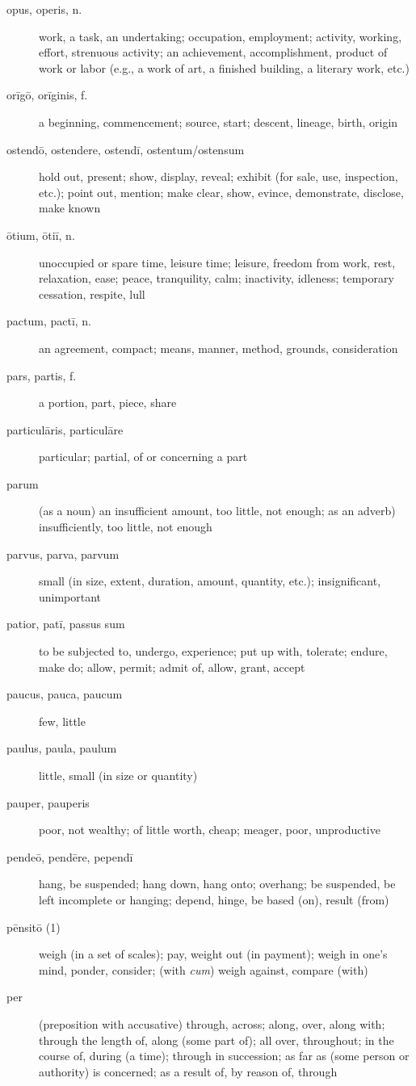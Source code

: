 \begin{description}
    \item[opus, operis, n.] work, a task, an undertaking; occupation, employment; activity, working, effort, strenuous activity; an achievement, accomplishment, product of work or labor (e.g., a work of art, a finished building, a literary work, etc.)
    \item[orīgō, orīginis, f.] a beginning, commencement; source, start; descent, lineage, birth, origin
    \item[ostendō, ostendere, ostendī, ostentum/ostensum] hold out, present; show, display, reveal; exhibit (for sale, use, inspection, etc.); point out, mention; make clear, show, evince, demonstrate, disclose, make known
    \item[ōtium, ōtiī, n.] unoccupied or spare time, leisure time; leisure, freedom from work, rest, relaxation, ease; peace, tranquility, calm; inactivity, idleness; temporary cessation, respite, lull
    \item[pactum, pactī, n.] an agreement, compact; means, manner, method, grounds, consideration
    \item[pars, partis, f.] a portion, part, piece, share
    \item[particulāris, particulāre] particular; partial, of or concerning a part
    \item[parum] (as a noun) an insufficient amount, too little, not enough; as an adverb) insufficiently, too little, not enough
    \item[parvus, parva, parvum] small (in size, extent, duration, amount, quantity, etc.); insignificant, unimportant
    \item[patior, patī, passus sum] to be subjected to, undergo, experience; put up with, tolerate; endure, make do; allow, permit; admit of, allow, grant, accept
    \item[paucus, pauca, paucum] few, little
    \item[paulus, paula, paulum] little, small (in size or quantity)
    \item[pauper, pauperis] poor, not wealthy; of little worth, cheap; meager, poor, unproductive
    \item[pendeō, pendēre, pependī] hang, be suspended; hang down, hang onto; overhang; be suspended, be left incomplete or hanging; depend, hinge, be based (on), result (from)
    \item[pēnsitō (1)] weigh (in a set of scales); pay, weight out (in payment); weigh in one's mind, ponder, consider; (with \textit{cum}) weigh against, compare (with)
    \item[per] (preposition with accusative) through, across; along, over, along with; through the length of, along (some part of); all over, throughout; in the course of, during (a time); through in succession; as far as (some person or authority) is concerned; as a result of, by reason of, through

\end{description}

